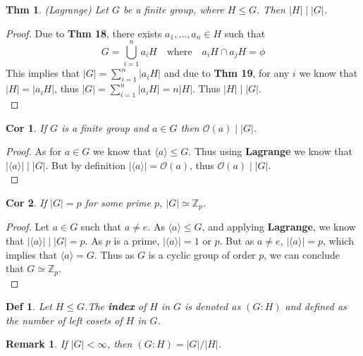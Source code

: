 \documentclass[paper=a4, fontsize=11pt]{scrartcl}
\newcommand{\Zn}[1]{\mathbb{Z}_{#1}}
\newtheorem{theorem}{Thm}
\newtheorem{definition}{Def}
\newtheorem{cor}{Cor}
\newtheorem*{remark}{Remark}
\begin{document}
\begin{theorem}(Lagrange)
	Let $G$ be a finite group, where $H \leqslant G$. Then $|H| \mid |G|$.
\end{theorem}

\begin{proof}
	Due to \textbf{Thm 18}, there exists $a_1,\dots,a_n \in H$ such that 
	\begin{equation}\nonumber
		G = \bigcup\limits_{i=1}^n a_i H \quad \text{where} \quad a_i H \cap a_j H =\phi
	\end{equation}
	This implies that $|G|=\sum_{i=1}^n |a_iH|$ and due to \textbf{Thm 19}, for any $i$ we know that $|H|=|a_i H|$, thus $|G|=\sum_{i=1}^n |a_iH|=n|H|$. Thus $|H| \mid |G|$.\\ 
\end{proof}

\begin{cor}
	If $G$ is a finite group and $a\in G$ then $\mathcal{O}(a) \mid |G|$.
\end{cor}

\begin{proof}
	As for $a\in G$ we know that $\langle a \rangle \leqslant G$. Thus using \textbf{Lagrange} we know that $|\langle a \rangle| \mid |G|$. But by definition $|\langle a \rangle|=\mathcal{O}(a)$, thus $\mathcal{O}(a) \mid |G|$.\\
\end{proof}

\begin{cor}
	If $|G|=p$ for some prime $p$, $|G| \simeq \mathbb{Z}_p$.
\end{cor}

\begin{proof}
	Let $a\in G$ such that $a\neq e$. As $\langle a \rangle \leqslant G$, and applying \textbf{Lagrange}, we know that $|\langle a \rangle| \mid |G| = p$. As $p$ is a prime, $|\langle a \rangle|=1$ or $p$. But as $a\neq e$, $|\langle a \rangle|=p$, which implies that $\langle a \rangle = G$. Thus as $G$ is a cyclic group of order $p$, we can conclude that $G \simeq \Zn{p}$.\\
\end{proof}

\begin{definition}
	Let $H \leqslant G$.The \textbf{index} of $H$ in $G$ is denoted as $(G:H)$ and defined as the number of left cosets of $H$ in $G$. \\
\end{definition}

\begin{remark}
	If $|G| < \infty$, then $(G:H) = |G| / |H|$. \\
\end{remark}
\end{document}
